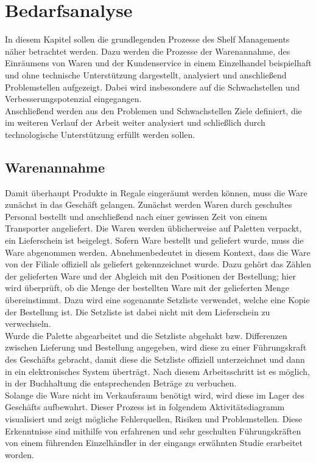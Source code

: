 \chapter{Bedarfsanalyse}
\label{cha:bedarfsanalyse}
In diesem Kapitel sollen die grundlegenden Prozesse des Shelf Managements näher betrachtet werden. Dazu werden die Prozesse der Warenannahme, des Einräumens von Waren und der Kundenservice in einem Einzelhandel beispielhaft und ohne technische Unterstützung dargestellt, analysiert und anschließend Problemstellen aufgezeigt. Dabei wird insbesondere auf die Schwachstellen und Verbesserungspotenzial eingegangen.\\
Anschließend werden aus den Problemen und Schwachstellen Ziele definiert, die im weiteren Verlauf der Arbeit weiter analysiert und schließlich durch technologische Unterstützung erfüllt werden sollen.

\section{Warenannahme}
\label{cha:warenannahme}
Damit überhaupt Produkte in Regale eingeräumt werden können, muss die Ware zunächst in das Geschäft gelangen. Zunächst werden Waren durch geschultes Personal bestellt und anschließend nach einer gewissen Zeit von einem Transporter angeliefert. Die Waren werden üblicherweise auf Paletten verpackt, ein Lieferschein ist beigelegt. Sofern Ware bestellt und geliefert wurde, muss die Ware abgenommen werden. \glqq Abnehmen\grqq bedeutet in diesem Kontext, dass die Ware von der Filiale offiziell als geliefert gekennzeichnet wurde. Dazu gehört das Zählen der gelieferten Ware und der Abgleich mit den Positionen der Bestellung; hier wird überprüft, ob die Menge der bestellten Ware mit der gelieferten Menge übereinstimmt. Dazu wird eine sogenannte Setzliste verwendet, welche eine Kopie der Bestellung ist. Die Setzliste ist dabei nicht mit dem Lieferschein zu verwechseln.\\

Wurde die Palette abgearbeitet und die Setzliste abgehakt bzw. Differenzen zwischen Lieferung und Bestellung angegeben, wird diese zu einer Führungskraft des Geschäfts gebracht, damit diese die Setzliste offiziell unterzeichnet und dann in ein elektronisches System überträgt. Nach diesem Arbeitsschritt ist es möglich, in der Buchhaltung die entsprechenden Beträge zu verbuchen.\\

Solange die Ware nicht im Verkaufsraum benötigt wird, wird diese im Lager des Geschäfts aufbewahrt. Dieser Prozess ist in folgendem Aktivitätsdiagramm visualisiert und zeigt mögliche Fehlerquellen, Risiken und Problemstellen. Diese Erkenntnisse sind mithilfe von erfahrenen und sehr geschulten Führungskräften von einem führenden Einzelhändler in der eingangs erwähnten Studie erarbeitet worden.\\

